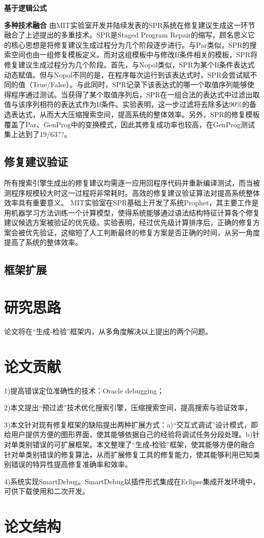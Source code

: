 \textbf{基于逻辑公式}
\cite{2004}

\textbf{多种技术融合}
由MIT实验室开发并陆续发表的SPR系统在修复建议生成这一环节融合了上述提出的多重技术。SPR是Staged Program Repair的缩写，顾名思义它的核心思想是将修复建议生成过程分为几个阶段逐步进行。与Par类似，SPR的搜索空间也由一组修复模板定义。而对这组模板中与修改If条件相关的模板，SPR将修复建议生成过程分为几个阶段。首先，与Nopol类似，SPR为某个If条件表达式动态赋值。但与Nopol不同的是，在程序每次运行到该表达式时，SPR会尝试赋不同的值（True/False）。与此同时，SPR记录下该表达式的哪一个取值序列能够使得程序通过测试。当获得了某个取值序列后，SPR在一组合法的表达式中过滤出取值与该序列相符的表达式作为If条件。实验表明，这一步过滤将去除多达90\%的备选表达式，从而大大压缩搜索空间，提高系统的整体效率。另外，SPR的修复模板覆盖了Par、GenProg中的变换模式，因此其修复成功率也较高，在GenProg测试集上达到了19/63??。

\subsection{修复建议验证}

所有搜索引擎生成出的修复建议均需逐一应用回程序代码并重新编译测试，而当被测程序规模较大时这一过程将非常耗时。高效的修复建议验证算法对提高系统整体效率具有重要意义。
MIT实验室在SPR基础上开发了系统Prophet，其主要工作是用机器学习方法训练一个计算模型，使得系统能够通过语法结构特征计算各个修复建议候选方案被验证的优先级。实验表明，经过优先级计算排序后，正确的修复方案会被优先验证，这缩短了人工判断最终的修复方案是否正确的时间，从另一角度提高了系统的整体效率。

\subsection{框架扩展}


\section{研究思路}%

论文将在“生成-检验”框架内，从多角度解决以上提出的两个问题。

\section{论文贡献}%
1)提高错误定位准确性的技术：Oracle debugging；

2)本文提出“预过滤”技术优化搜索引擎，压缩搜索空间，提高搜索与验证效率，

3)本文针对现有修复框架的缺陷提出两种扩展方式：a)“交互式调试”设计模式，即给用户提供方便的图形界面，使其能够依据自己的经验将调试任务分段处理。b)针对单类别错误的可扩展框架。本文整理了“生成-检验”框架，使其能够方便的融合针对单类别错误的修复算法，从而扩展修复工具的修复能力，使其能够利用已知类别错误的特异性提高修复准确率和效率。

4)系统实现SmartDebug。SmartDebug以插件形式集成在Eclipse集成开发环境中，可供下载使用和二次开发。
\section{论文结构}%
